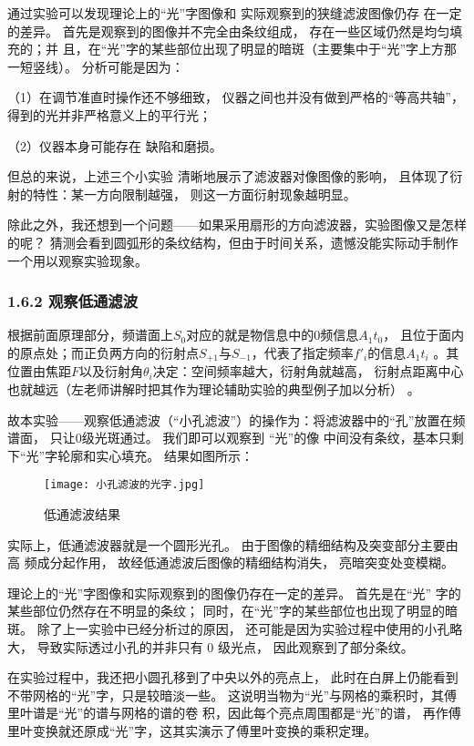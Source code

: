 \documentclass[11pt]{article}
\begin{document}
通过实验可以发现理论上的“光”字图像和
实际观察到的狭缝滤波图像仍存
在一定的差异。
首先是观察到的图像并不完全由条纹组成，
存在一些区域仍然是均匀填充的；并
且，在“光”字的某些部位出现了明显的暗斑（主要集中于“光”字上方那一短竖线）。
分析可能是因为：

（1）在调节准直时操作还不够细致，
仪器之间也并没有做到严格的“等高共轴”，
得到的光并非严格意义上的平行光；

（2）仪器本身可能存在
缺陷和磨损。

但总的来说，上述三个小实验
清晰地展示了滤波器对像图像的影响，
且体现了衍射的特性：某一方向限制越强，
则这一方面衍射现象越明显。

除此之外，我还想到一个问题——如果采用扇形的方向滤波器，实验图像又是怎样的呢？
猜测会看到圆弧形的条纹结构，但由于时间关系，遗憾没能实际动手制作一个用以观察实验现象。


\subsubsection*{1.6.2 观察低通滤波}

根据前面原理部分，频谱面上$S_0$对应的就是物信息中的0频信息$A_1t_0$，
且位于面内的原点处；而正负两方向的衍射点$S_{+1}$与$S_{-1}$，代表了指定频率$f'_i$的信息$A_1t_i$
。其位置由焦距$F$以及衍射角$\theta_i$决定：空间频率越大，衍射角就越高，
衍射点距离中心也就越远（左老师讲解时把其作为理论辅助实验的典型例子加以分析）
。

故本实验——观察低通滤波（“小孔滤波”）的操作为：将滤波器中的“孔”放置在频谱面，
只让0级光斑通过。
我们即可以观察到 “光”的像
中间没有条纹，基本只剩下“光”字轮廓和实心填充。
结果如图所示：

\begin{figure}[H]
    \centering
    \texttt{[image: 小孔滤波的光字.jpg]}
    \caption{低通滤波结果}
\end{figure}

实际上，低通滤波器就是一个圆形光孔。
由于图像的精细结构及突变部分主要由高
频成分起作用，
故经低通滤波后图像的精细结构消失，
亮暗突变处变模糊。

理论上的“光”字图像和实际观察到的图像仍存在一定的差异。
首先是在“光”
字的某些部位仍然存在不明显的条纹；
同时，在“光”字的某些部位也出现了明显的暗斑。
除了上一实验中已经分析过的原因，
还可能是因为实验过程中使用的小孔略大，
导致实际透过小孔的并非只有 0 级光点，
因此观察到了部分条纹。

在实验过程中，我还把小圆孔移到了中央以外的亮点上，
此时在白屏上仍能看到不带网格的“光”字，只是较暗淡一些。
这说明当物为“光”与网格的乘积时，其傅里叶谱是“光”的谱与网格的谱的卷
积，因此每个亮点周围都是“光”的谱，
再作傅里叶变换就还原成“光”字，这其实演示了傅里叶变换的乘积定理。
\end{document}
